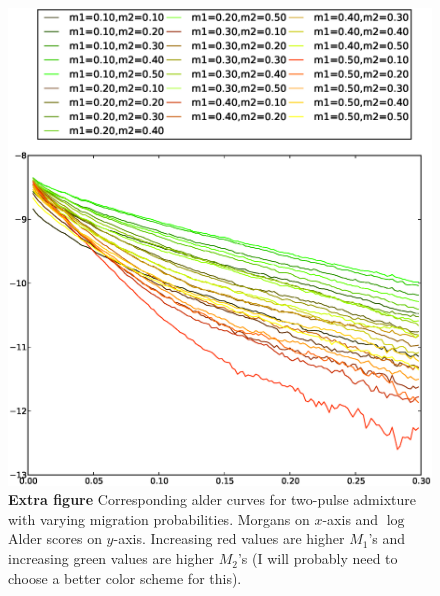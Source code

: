 \begin{figure}
\includegraphics[scale=.6]{alder_ms.eps}
\caption{
{\bf Extra figure} Corresponding alder curves for two-pulse admixture with varying migration probabilities. Morgans on $x$-axis and $\log$ Alder scores on $y$-axis. Increasing red values are higher $M_1$'s and increasing green values are higher $M_2$'s  (I will probably need to choose a better color scheme for this).
}
\end{figure}



